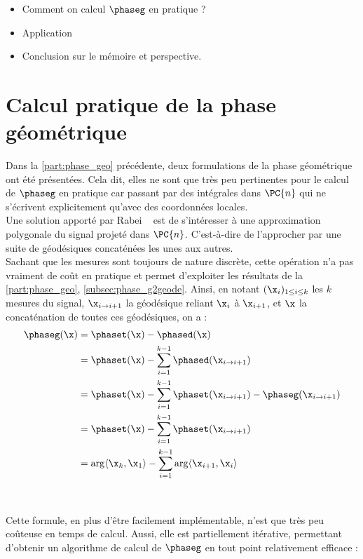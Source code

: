 
\begin{itemize}
	
	\item Comment on calcul $\phaseg$ en pratique ?
	
	\item Application
	
	\item Conclusion sur le mémoire et perspective.
\end{itemize}




\section{Calcul pratique de la phase géométrique}

Dans la \cref{part:phase_geo} précédente, deux formulations de la phase géométrique ont été présentées. Cela dit, elles ne sont que très peu pertinentes pour le calcul de $\phaseg$ en pratique car passant par des intégrales dans $\PC{n}$ qui ne s'écrivent explicitement qu'avec des coordonnées locales.
\\

Une solution apporté par Rabei \etal~\cite{rabei_bargmann_1999} est de s'intéresser à une approximation polygonale du signal projeté dans $\PC{n}$. 
C'est-à-dire de l'approcher par une suite de géodésiques concaténées les unes aux autres. 
\\
Sachant que les mesures sont toujours de nature discrète, cette opération n'a pas vraiment de coût en pratique et permet d'exploiter les résultats de la \cref{part:phase_geo}, \cref{subsec:phase_g2geode}. 
Ainsi, en notant $(\x_i)_{1\leq i\leq k}$ les $k$ mesures du signal, $\x_{i\rightarrow i+1}$ la géodésique reliant $\x_i$ à $\x_{i+1}$, et $\x$ la concaténation de toutes ces géodésiques, on a  :
\begin{align*}
	\phaseg(\x) &= \phaset(\x) - \phased(\x) \\
	&= \phaset(\x) - \sum_{i=1}^{k-1} \phased(\x_{i\rightarrow i+1}) \\
	&= \phaset(\x) - \sum_{i=1}^{k-1} \phaset(\x_{i\rightarrow i+1}) - \phaseg(\x_{i\rightarrow i+1}) \\
	&= \phaset(\x) - \sum_{i=1}^{k-1} \phaset(\x_{i\rightarrow i+1}) \\
	&= \arg\langle\x_k, \x_1\rangle - \sum_{i=1}^{k-1} \arg\langle\x_{i+1}, \x_i\rangle
\end{align*} 
\\
\\
Cette formule, en plus d'être facilement implémentable, n'est que très peu coûteuse en temps de calcul. Aussi, elle est partiellement itérative, permettant d'obtenir un algorithme de calcul de $\phaseg$ en tout point relativement efficace :

